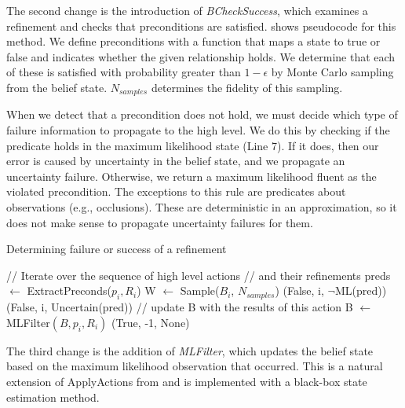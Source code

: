 The second change is the introduction of \emph{BCheckSuccess}, which
examines a refinement and checks that preconditions are
satisfied.  shows pseudocode for this method. We
define preconditions with a function that maps a state to true or
false and indicates whether the given relationship holds.  We
determine that each of these is satisfied with probability greater
than $1-\epsilon$ by Monte Carlo sampling from the belief
state. $N_{samples}$ determines the fidelity of this sampling.

When we detect that a precondition does not hold, we must decide which
type of failure information to propagate to the high level. We do this
by checking if the predicate holds in the maximum likelihood state
(Line 7). If it does, then our error is caused by uncertainty in the
belief state, and we propagate an uncertainty failure. Otherwise,
we return a maximum likelihood fluent as the violated
precondition. The exceptions to this rule are predicates about
observations (e.g., occlusions). These are deterministic in an \mld{}
approximation, so it does not make sense to propagate uncertainty
failures for them.

\begin{algorithm}
 \caption{Determining failure or success of a refinement} \label{alg-bcheck}
 \begin{algorithmic}[1]
      \State // Iterate over the sequence of high level actions      
      \State // and their refinements
          \State preds $\leftarrow $ ExtractPreconds($p_i, R_i$)
          \State W $\leftarrow$ Sample($B_i$, $N_{samples}$)
                     \State \Return (False, i, $\lnot$ML(pred))
                 \Else
                     \State \Return (False, i, Uncertain(pred))
                 \EndIf
              \EndIf
          \EndFor
          \State // update B with the results of this action
          \State B $\leftarrow$ MLFilter$(B, p_i, R_i)$
      \EndFor
      \State \Return (True, -1, None)
  \EndProcedure
 \end{algorithmic}
\end{algorithm}


The third change is the addition of \emph{MLFilter}, which updates the
belief state based on the maximum likelihood observation that
occurred. This is a natural extension of ApplyActions from
 and is implemented with a black-box state
estimation method.

